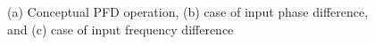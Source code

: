 \begin{figure}[!h]
    \centering
    \caption{(a) Conceptual PFD operation, (b) case of input phase difference, and (c) case of input frequency difference}
    \label{fig:pfd_block}
\end{figure}